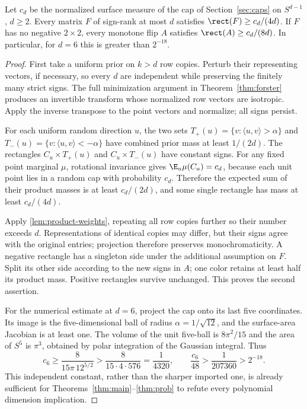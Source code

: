 \begin{proposition}\label{prop:cap-bound}
Let $c_d$ be the normalized surface measure of the cap of Section~\ref{sec:caps} on $S^{d-1}$, $d\ge2$. Every matrix $F$ of sign-rank at most $d$ satisfies $\rect(F)\ge c_d/(4d)$. If $F$ has no negative $2\times2$, every monotone flip $A$ satisfies $\rect(A)\ge c_d/(8d)$. In particular, for $d=6$ this is greater than $2^{-18}$.
\end{proposition}

\begin{proof}
First take a uniform prior on $k>d$ row copies. Perturb their representing vectors, if necessary, so every $d$ are independent while preserving the finitely many strict signs. The full minimization argument in Theorem~\ref{thm:forster} produces an invertible transform whose normalized row vectors are isotropic. Apply the inverse transpose to the point vectors and normalize; all signs persist.

For each uniform random direction $u$, the two sets $T_+(u)=\{v:\langle u,v\rangle>\alpha\}$ and $T_-(u)=\{v:\langle u,v\rangle<-\alpha\}$ have combined prior mass at least $1/(2d)$. The rectangles $C_u\times T_+(u)$ and $C_u\times T_-(u)$ have constant signs. For any fixed point marginal $\mu$, rotational invariance gives $\E_u\mu(C_u)=c_d$, because each unit point lies in a random cap with probability $c_d$. Therefore the expected sum of their product masses is at least $c_d/(2d)$, and some single rectangle has mass at least $c_d/(4d)$.

Apply \cref{lem:product-weights}, repeating all row copies further so their number exceeds $d$. Representations of identical copies may differ, but their signs agree with the original entries; projection therefore preserves monochromaticity. A negative rectangle has a singleton side under the additional assumption on $F$. Split its other side according to the new signs in $A$; one color retains at least half its product mass. Positive rectangles survive unchanged. This proves the second assertion.

For the numerical estimate at $d=6$, project the cap onto its last five coordinates. Its image is the five-dimensional ball of radius $\alpha=1/\sqrt{12}$, and the surface-area Jacobian is at least one. The volume of the unit five-ball is $8\pi^2/15$ and the area of $S^5$ is $\pi^3$, obtained by polar integration of the Gaussian integral. Thus
\[
 c_6\ge\frac8{15\pi\,12^{5/2}}>
 \frac8{15\cdot4\cdot576}=\frac1{4320},
 \qquad \frac{c_6}{48}>\frac1{207360}>2^{-18}.
\]
This independent constant, rather than the sharper imported one, is already sufficient for Theorems~\ref{thm:main}--\ref{thm:prob} to refute every polynomial dimension implication.
\end{proof}
